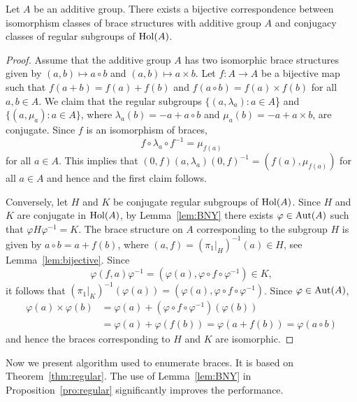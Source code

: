 \begin{proposition}
\label{pro:regular}
	Let $A$ be an additive group.  There exists a bijective correspondence between
	isomorphism classes of 
	brace structures with additive group $A$ and conjugacy classes of regular subgroups of
	$\operatorname{Hol}(A)$. 

	\begin{proof}
        Assume that the additive group $A$ has two isomorphic brace structures given by
		$(a,b)\mapsto a\circ b$ and $(a,b)\mapsto a\times b$. Let 
		$f\colon A\to A$ be a bijective map such that $f(a+b)=f(a)+f(b)$ and $f(a\circ b)=f(a)\times f(b)$ for
		all $a,b\in A$. 
		We claim that the regular subgroups $\{(a,\lambda_a):a\in A$\} and
		$\{(a,\mu_a):a\in A\}$, where $\lambda_a(b)=-a+a\circ b$ and
		$\mu_a(b)=-a+a\times b$, are conjugate. 
		Since $f$ is an isomorphism of braces, 
		\[
		f\circ\lambda_a\circ f^{-1}=\mu_{f(a)}
		\]
		for all $a\in A$. This implies that $(0,f)(a,\lambda_a)(0,f)^{-1}=(f(a),\mu_{f(a)})$ 
		for all $a\in A$ and hence 
		and the first claim follows. 
		
		Conversely, let $H$ and $K$ be conjugate regular subgroups of $\operatorname{Hol}(A)$. Since $H$ and $K$ are conjugate in $\operatorname{Hol}(A)$, by 
		Lemma~\ref{lem:BNY} there exists $\varphi\in\operatorname{Aut}(A)$ such that $\varphi
		H\varphi^{-1}=K$. The brace structure on $A$ corresponding to the subgroup $H$ is given by 
		$a\circ b=a+f(b)$,
		where
		$(a,f)=(\pi_1|_H)^{-1}(a)\in H$, see Lemma~\ref{lem:bijective}. 
		Since 
        \[
        \varphi(f,a)\varphi^{-1}=(\varphi(a),\varphi\circ f\circ \varphi^{-1})\in K,
        \]
        it follows that 
        $(\pi_1|_K)^{-1}(\varphi(a))=(\varphi(a),\varphi\circ f\circ \varphi^{-1})$. Since $\varphi\in\operatorname{Aut}(A)$, 
        \begin{align*}
            \varphi(a)\times\varphi(b)&=\varphi(a)+(\varphi\circ f\circ\varphi^{-1})(\varphi(b))\\
            &=\varphi(a)+\varphi(f(b))=\varphi(a+f(b))=\varphi(a\circ b)
        \end{align*}
        and hence the braces corresponding to $H$ and $K$ are
		isomorphic.
	\end{proof}
\end{proposition}

Now we present algorithm used to enumerate braces. It is based 
on Theorem~\ref{thm:regular}. The use of Lemma~\ref{lem:BNY} 
in Proposition~\ref{pro:regular} significantly improves the performance.  

